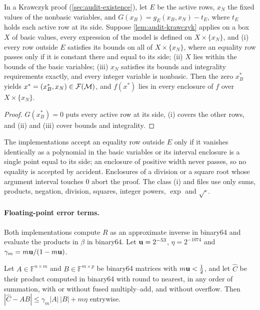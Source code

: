 \begin{corollary}\label{cor:audit-box}
In a Krawczyk proof (\cref{sec:audit-existence}), let $E$ be the active rows, $x_N$ the fixed values of the nonbasic variables, and $G(x_B)=g_E(x_B,x_N)-t_E$, where $t_E$ holds each active row at its side.
Suppose \cref{lem:audit-krawczyk} applies on a box $X$ of basic values, every expression of the model is defined on $X\times\{x_N\}$, and
(i) every row outside $E$ satisfies its bounds on all of $X\times\{x_N\}$, where an equality row passes only if it is constant there and equal to its side;
(ii) $X$ lies within the bounds of the basic variables;
(iii) $x_N$ satisfies its bounds and integrality requirements exactly, and every integer variable is nonbasic.
Then the zero $x_B^\ast$ yields $x^\ast=(x_B^\ast,x_N)\in\mathcal{F}(\mathcal{M})$, and $f(x^\ast)$ lies in every enclosure of $f$ over $X\times\{x_N\}$.
\end{corollary}

\begin{proof}
$G(x_B^\ast)=0$ puts every active row at its side, (i) covers the other rows, and (ii) and (iii) cover bounds and integrality.
\end{proof}

The implementations accept an equality row outside $E$ only if it vanishes identically as a polynomial in the basic variables or its interval enclosure is a single point equal to its side; an enclosure of positive width never passes, so no equality is accepted by accident.
Enclosures of a division or a square root whose argument interval touches 0 abort the proof.
The class (i) and  files use only sums, products, negation, division, squares, integer powers, $\exp$ and $\sqrt{\cdot}$.

\paragraph{Floating-point error terms.}
Both implementations compute $R$ as an approximate inverse in binary64 and evaluate the products in $\beta$ in binary64.
Let $\mathbf{u}=2^{-53}$, $\eta=2^{-1074}$ and $\gamma_m=m\mathbf{u}/(1-m\mathbf{u})$.

\begin{lemma}\label{lem:audit-fp}
Let $A\in\mathbb F^{n\times m}$ and $B\in\mathbb F^{m\times p}$ be binary64 matrices with $m\mathbf{u}<\tfrac12$, and let $\widehat C$ be their product computed in binary64 with round to nearest, in any order of summation, with or without fused multiply–add, and without overflow.
Then $|\widehat C-AB|\le\gamma_m|A|\,|B|+m\eta$ entrywise.
\end{lemma}

